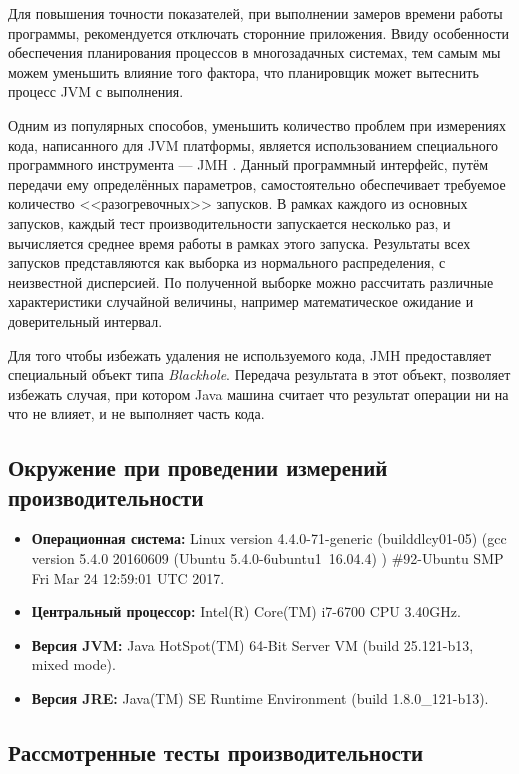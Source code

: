 Для повышения точности показателей, при выполнении замеров времени работы программы, рекомендуется отключать сторонние приложения. Ввиду особенности обеспечения планирования процессов в многозадачных системах, тем самым мы можем уменьшить влияние того фактора, что планировщик может вытеснить процесс JVM с выполнения.

Одним из популярных способов, уменьшить количество проблем при измерениях кода, написанного для JVM платформы, является использованием специального программного инструмента --- JMH \cite{java:jmh}. Данный программный интерфейс, путём передачи ему определённых параметров, самостоятельно обеспечивает требуемое количество <<разогревочных>> запусков. В рамках каждого из основных запусков, каждый тест производительности запускается несколько раз, и вычисляется среднее время работы в рамках этого запуска. Результаты всех запусков представляются как выборка из нормального распределения, с неизвестной дисперсией. По полученной выборке можно рассчитать различные характеристики случайной величины, например математическое ожидание и доверительный интервал.

Для того чтобы избежать удаления не используемого кода, JMH предоставляет специальный объект типа \textit{Blackhole}. Передача результата в этот объект, позволяет избежать случая, при котором Java машина считает что результат операции ни на что не влияет, и не выполняет часть кода.

\subsection{Окружение при проведении измерений производительности}

\begin{itemize}
    \item \textbf{Операционная система:} Linux version 4.4.0-71-generic (buildd\at lcy01-05) (gcc version 5.4.0 20160609 (Ubuntu 5.4.0-6ubuntu1~16.04.4) ) \#92-Ubuntu SMP Fri Mar 24 12:59:01 UTC 2017.
    \item \textbf{Центральный процессор:}  Intel(R) Core(TM) i7-6700 CPU \at 3.40GHz.
    \item \textbf{Версия JVM:}  Java HotSpot(TM) 64-Bit Server VM (build 25.121-b13, mixed mode).
    \item \textbf{Версия JRE:}  Java(TM) SE Runtime Environment (build 1.8.0\_121-b13).
\end{itemize}


\subsection{Рассмотренные тесты производительности}

